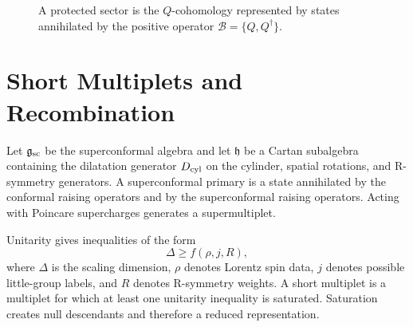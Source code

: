 \begin{figure}[H]
  \centering
  \caption{A protected sector is the \(Q\)-cohomology represented by states
  annihilated by the positive operator \(\mathcal B=\{Q,Q^\dagger\}\).}
  \label{fig:protected-sector-cohomology}
\end{figure}

\section{Short Multiplets and Recombination}

Let \(\mathfrak g_{\rm sc}\) be the superconformal algebra and let
\(\mathfrak h\) be a Cartan subalgebra containing the dilatation generator
\(D_{\rm cyl}\) on the cylinder, spatial rotations, and R-symmetry
generators.  A superconformal primary is a state annihilated by the conformal
raising operators and by the superconformal raising operators.  Acting with
Poincare supercharges generates a supermultiplet.

Unitarity gives inequalities of the form
\begin{equation}
  \Delta\ge f(\rho,j,R),
  \label{eq:superconformal-shortening-bound}
\end{equation}
where \(\Delta\) is the scaling dimension, \(\rho\) denotes Lorentz spin
data, \(j\) denotes possible little-group labels, and \(R\) denotes
R-symmetry weights.  A short multiplet is a multiplet for which at least one
unitarity inequality is saturated.  Saturation creates null descendants and
therefore a reduced representation.

